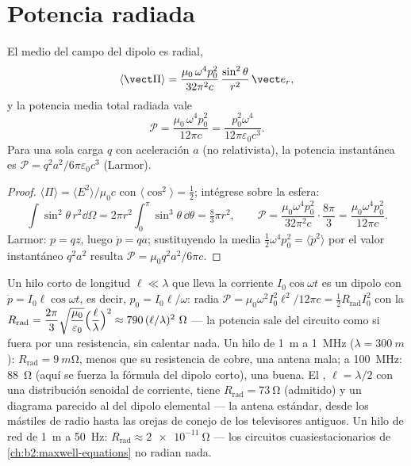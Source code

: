 \section{Potencia radiada}

\begin{proposition}\label{prop:b2:dipole-radiation:power}
El  medio del campo del dipolo es radial,
\[
\langle\vect\Pi\rangle = \frac{\mu_0\,\omega^4p_0^2}{32\pi^2c}\,\frac{\sin^2\theta}{r^2}\,\vect e_r ,
\]
y la potencia media total radiada vale
\[
\mathcal P = \frac{\mu_0\,\omega^4p_0^2}{12\pi c} = \frac{p_0^2\omega^4}{12\pi\varepsilon_0c^3} .
\]
Para una sola carga $q$ con aceleración $a$ (no relativista), la
potencia instantánea es $\mathcal P = q^2a^2/6\pi\varepsilon_0c^3$ (Larmor).
\end{proposition}

\begin{proof}
$\langle\Pi\rangle = \langle E^2\rangle/\mu_0c$ con $\langle\cos^2\rangle = \tfrac12$;
intégrese sobre la esfera:
\[
\int\sin^2\theta\,r^2\dd\Omega = 2\pi r^2\int_0^\pi\sin^3\theta\,\dd\theta = \tfrac83\pi r^2 ,
\qquad
\mathcal P = \frac{\mu_0\omega^4p_0^2}{32\pi^2c}\cdot\frac{8\pi}3 = \frac{\mu_0\omega^4p_0^2}{12\pi c} .
\]
Larmor: $p = qz$, luego $\ddot p = qa$;
sustituyendo la media $\tfrac12\omega^4p_0^2 = \langle\ddot p^2\rangle$ por el
valor instantáneo $q^2a^2$ resulta $\mathcal P = \mu_0q^2a^2/6\pi c$.
\end{proof}

\begin{example}\label{ex:b2:dipole-radiation:antenna}
Un hilo corto de longitud $\ell \ll \lambda$ que lleva la corriente $I_0\cos\omega t$ es un
dipolo con $\dot p = I_0\ell\cos\omega t$, es decir, $p_0 = I_0\ell/\omega$: radia
$\mathcal P = \mu_0\omega^2I_0^2\ell^2/12\pi c = \tfrac12R_{\text{rad}}I_0^2$ con la
\emph{} $R_{\text{rad}} = \dfrac{2\pi}3\sqrt{\dfrac{\mu_0}{\varepsilon_0}}
\Bigl(\dfrac\ell\lambda\Bigr)^2 \approx 790\,(\ell/\lambda)^2\ \Omega$ --- la potencia sale del
circuito como si fuera por una resistencia, sin calentar nada. Un hilo de \qty{1}{m}
a \qty{1}{MHz} ($\lambda = \qty{300}{m}$): $R_{\text{rad}} = \qty{9}{m\ohm}$, menos que
su resistencia de cobre, una antena mala; a \qty{100}{MHz}: \qty{88}{\ohm} (aquí se
fuerza la fórmula del dipolo corto), una buena. El \emph{}, $\ell = \lambda/2$ con una distribución senoidal de corriente, tiene
$R_{\text{rad}} = \qty{73}{\ohm}$ (admitido) y un diagrama parecido al del
dipolo elemental --- la antena estándar, desde los mástiles de radio hasta
las orejas de conejo de los televisores antiguos. Un hilo de red de \qty{1}{m} a \qty{50}{Hz}:
$R_{\text{rad}} \approx \qty{2e-11}{\ohm}$ --- los circuitos cuasiestacionarios de
\cref{ch:b2:maxwell-equations} no radian nada.
\end{example}

